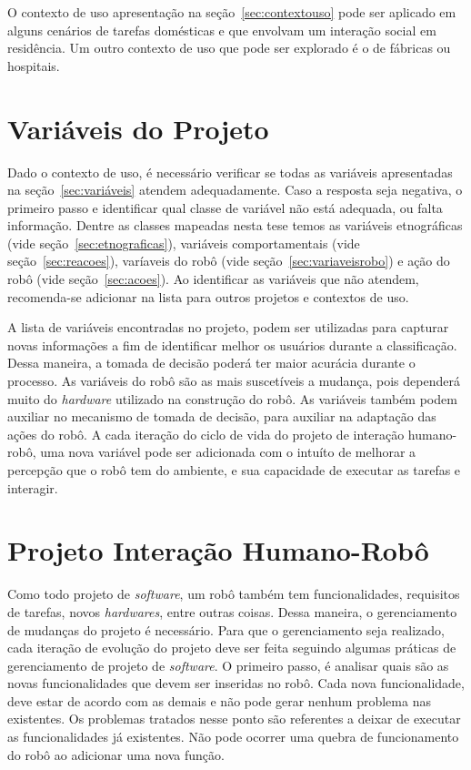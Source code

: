O contexto de uso apresentação na seção~\ref{sec:contextouso} pode ser aplicado em alguns cenários de tarefas domésticas e que envolvam um interação social em residência. Um outro contexto de uso que pode ser explorado é o de fábricas ou hospitais.

\section{Variáveis do Projeto}
\label{sec:variaveisprojeto2}
Dado o contexto de uso, é necessário verificar se todas as variáveis apresentadas na seção~\ref{sec:variáveis} atendem adequadamente. Caso a resposta seja negativa, o primeiro passo e identificar qual classe de variável não está adequada, ou falta informação. Dentre as classes mapeadas nesta tese temos as variáveis etnográficas (vide seção~\ref{sec:etnograficas}), variáveis comportamentais (vide seção~\ref{sec:reacoes}), varíaveis do robô (vide seção~\ref{sec:variaveisrobo}) e ação do robô (vide seção~\ref{sec:acoes}). Ao identificar as variáveis que não atendem, recomenda-se adicionar na lista para outros projetos e contextos de uso.

A lista de variáveis encontradas no projeto, podem ser utilizadas para capturar novas informações a fim de identificar melhor os usuários durante a classificação. Dessa maneira, a tomada de decisão poderá ter maior acurácia durante o processo. As variáveis do robô são as mais suscetíveis a mudança, pois dependerá muito do \emph{hardware} utilizado na construção do robô. As variáveis também podem auxiliar no mecanismo de tomada de decisão, para auxiliar na adaptação das ações do robô. A cada iteração do ciclo de vida do projeto de interação humano-robô, uma nova variável pode ser adicionada com o intuíto de melhorar a percepção que o robô tem do ambiente, e sua capacidade de executar as tarefas e interagir.

\section{Projeto Interação Humano-Robô}
\label{sec:projetoihr2}
Como todo projeto de \emph{software}, um robô também tem funcionalidades, requisitos de tarefas, novos \emph{hardwares}, entre outras coisas. Dessa maneira, o gerenciamento de mudanças do projeto é necessário. Para que o gerenciamento seja realizado, cada iteração de evolução do projeto deve ser feita seguindo algumas práticas de gerenciamento de projeto de \emph{software}. O primeiro passo, é analisar quais são as novas funcionalidades que devem ser inseridas no robô. Cada nova funcionalidade, deve estar de acordo com as demais e não pode gerar nenhum problema nas existentes. Os problemas tratados nesse ponto são referentes a deixar de executar as funcionalidades já existentes. Não pode ocorrer uma quebra de funcionamento do robô ao adicionar uma nova função. 

